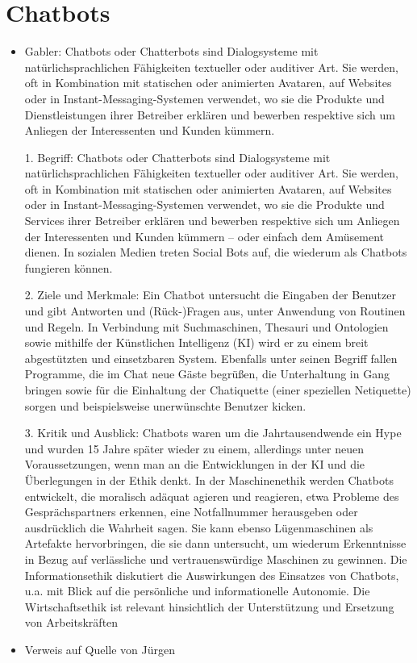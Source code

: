 \section{Chatbots}

\begin{itemize}
\item Gabler: Chatbots oder Chatterbots sind Dialogsysteme mit natürlichsprachlichen Fähigkeiten textueller oder auditiver Art. Sie werden, oft in Kombination mit statischen oder animierten Avataren, auf Websites oder in Instant-Messaging-Systemen verwendet, wo sie die Produkte und Dienstleistungen ihrer Betreiber erklären und bewerben respektive sich um Anliegen der Interessenten und Kunden kümmern.

1. Begriff: Chatbots oder Chatterbots sind Dialogsysteme mit natürlichsprachlichen Fähigkeiten textueller oder auditiver Art. Sie werden, oft in Kombination mit statischen oder animierten Avataren, auf Websites oder in Instant-Messaging-Systemen verwendet, wo sie die Produkte und Services ihrer Betreiber erklären und bewerben respektive sich um Anliegen der Interessenten und Kunden kümmern – oder einfach dem Amüsement dienen. In sozialen Medien treten Social Bots auf, die wiederum als Chatbots fungieren können.

2. Ziele und Merkmale: Ein Chatbot untersucht die Eingaben der Benutzer und gibt Antworten und (Rück-)Fragen aus, unter Anwendung von Routinen und Regeln. In Verbindung mit Suchmaschinen, Thesauri und Ontologien sowie mithilfe der Künstlichen Intelligenz (KI) wird er zu einem breit abgestützten und einsetzbaren System. Ebenfalls unter seinen Begriff fallen Programme, die im Chat neue Gäste begrüßen, die Unterhaltung in Gang bringen sowie für die Einhaltung der Chatiquette (einer speziellen Netiquette) sorgen und beispielsweise unerwünschte Benutzer kicken.

3. Kritik und Ausblick: Chatbots waren um die Jahrtausendwende ein Hype und wurden 15 Jahre später wieder zu einem, allerdings unter neuen Voraussetzungen, wenn man an die Entwicklungen in der KI und die Überlegungen in der Ethik denkt. In der Maschinenethik werden Chatbots entwickelt, die moralisch adäquat agieren und reagieren, etwa Probleme des Gesprächspartners erkennen, eine Notfallnummer herausgeben oder ausdrücklich die Wahrheit sagen. Sie kann ebenso Lügenmaschinen als Artefakte hervorbringen, die sie dann untersucht, um wiederum Erkenntnisse in Bezug auf verlässliche und vertrauenswürdige Maschinen zu gewinnen. Die Informationsethik diskutiert die Auswirkungen des Einsatzes von Chatbots, u.a. mit Blick auf die persönliche und informationelle Autonomie. Die Wirtschaftsethik ist relevant hinsichtlich der Unterstützung und Ersetzung von Arbeitskräften

\item Verweis auf Quelle von Jürgen

\end{itemize}

